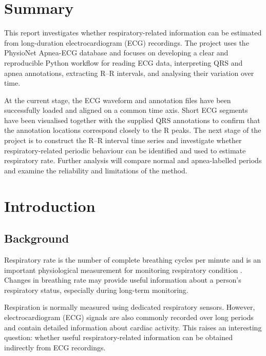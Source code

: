 \documentclass[a4paper,10.5pt,oneside]{report}
\begin{document}
\chapter*{Summary}

This report investigates whether respiratory-related information can be
estimated from long-duration electrocardiogram (ECG) recordings. The project
uses the PhysioNet Apnea-ECG database and focuses on developing a clear and
reproducible Python workflow for reading ECG data, interpreting QRS and apnea
annotations, extracting R--R intervals, and analysing their variation over
time.

At the current stage, the ECG waveform and annotation files have been
successfully loaded and aligned on a common time axis. Short ECG segments have
been visualised together with the supplied QRS annotations to confirm that the
annotation locations correspond closely to the R peaks. The next stage of the
project is to construct the R--R interval time series and investigate whether
respiratory-related periodic behaviour can be identified and used to estimate
respiratory rate. Further analysis will compare normal and apnea-labelled
periods and examine the reliability and limitations of the method.

\clearpage

\tableofcontents

\clearpage
{}
\chapter{Introduction}

\section{Background}

Respiratory rate is the number of complete breathing cycles per minute and is
an important physiological measurement for monitoring respiratory condition
\cite{lung2025}. Changes in breathing rate may provide useful information about
a person's respiratory status, especially during long-term monitoring.

Respiration is normally measured using dedicated respiratory sensors. However,
electrocardiogram (ECG) signals are also commonly recorded over long periods
and contain detailed information about cardiac activity. This raises an
interesting question: whether useful respiratory-related information can be
obtained indirectly from ECG recordings.
\end{document}
